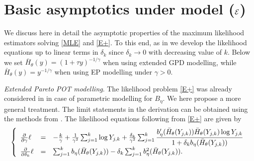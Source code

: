 \section{Basic asymptotics under model (${\cal E}$)}\label{chap5:sec3}

We discuss here in detail the asymptotic properties of the maximum likelihood estimators solving \eqref{MLE} and \eqref{E+}. To this end, as in \cite{beirlant2009second} we develop the likelihood equations up to linear terms in $\delta_k$ since $ \delta_k \to 0$ with decreasing value of $k$. 
Below we set $\bar{H}_{\theta}(y)=(1+\tau y)^{-1/\gamma}$ when using extended GPD modelling, while $\bar{H}_{\theta}(y)=y^{-1/\gamma}$ when using EP modelling under $\gamma >0$.

\vspace{0.2cm}\noindent
{\it Extended Pareto POT modelling}. The likelihood problem \eqref{E+} was already considered in \cite{beirlant2009second} in case of parametric modelling for $B_\eta$. We here propose a more general treatment. The limit statements in the derivation can be obtained using the methods from \cite{beirlant2009second}. The likelihood equations following from \eqref{E+} are given by
\begin{equation}
\left\{
\begin{array}{lcl}
{\partial \over \partial \gamma} \ell &=&
-{k \over \gamma }+ {1 \over \gamma^2} \sum_{j=1}^k \log Y_{j,k}
 + {\delta_k \over \gamma^2} \sum_{j=1}^k \dfrac{ b'_\eta (\bar{H}_{\theta}(Y_{j,k}))\bar{H}_{\theta}(Y_{j,k})\log Y_{j,k}}{1+\delta_k b_\eta (\bar{H}_{\theta}(Y_{j,k}))} \\
 {\partial \over \partial \delta_k} \ell &=&
 \sum_{j=1}^k b_\eta (\bar{H}_{\theta}(Y_{j,k}))-\delta_k \sum_{j=1}^k b^2_\eta (\bar{H}_{\theta}(Y_{j,k})).
\end{array}
\right.
\label{systemE+}
\end{equation}

